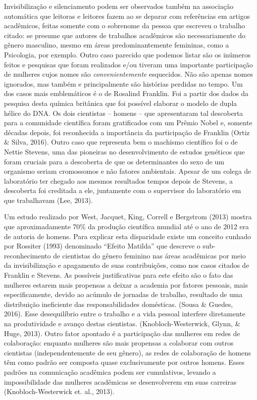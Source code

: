 Invisibilização e silenciamento podem ser observados também na associação automática que leitoras e leitores fazem ao se deparar com referências em artigos acadêmicos, feitas somente com o sobrenome da pessoa que escreveu o trabalho citado: se presume que autores de trabalhos acadêmicos são necessariamente do gênero masculino, mesmo em áreas predominantemente femininas, como a Psicologia, por exemplo. Outro caso parecido que podemos listar são os inúmeros feitos e pesquisas que foram realizados e/ou tiveram uma importante participação de mulheres cujos nomes são \textit{convenientemente} esquecidos. Não são apenas nomes ignorados, mas também e principalmente são histórias perdidas no tempo. Um dos casos mais emblemáticos é o de Rosalind Franklin. Foi a partir dos dados da pesquisa desta química britânica que foi possível elaborar o modelo de dupla hélice do DNA. Os dois cientistas – homens – que apresentaram tal descoberta para a comunidade científica foram gratificados com um Prêmio Nobel e, somente décadas depois, foi reconhecida a importância da participação de Franklin (Ortiz \& Silva, 2016). Outro caso que representa bem o machismo científico foi o de Nettie Stevens, uma das pioneiras no desenvolvimento de estudos genéticos que foram cruciais para a descoberta de que os determinantes do sexo de um organismo seriam cromossomos e não fatores ambientais. Apesar de um colega de laboratório ter chegado aos mesmos resultados tempos depois de Stevens, a descoberta foi creditada a ele, juntamente com o supervisor do laboratório em que trabalhavam (Lee, 2013).

Um estudo realizado por West, Jacquet, King, Correll e Bergstrom (2013) mostra que aproximadamente 70\% da produção científica mundial até o ano de 2012 era de autoria de homens. Para explicar esta disparidade existe um conceito cunhado por Rossiter (1993) denominado “Efeito Matilda” que descreve o sub-reconhecimento de cientistas do gênero feminino nas áreas acadêmicas por meio da invisibilização e apagamento de suas contribuições, como nos casos citados de Franklin e Stevens. As possíveis justificativas para este efeito são o fato das mulheres estarem mais propensas a deixar a academia por fatores pessoais, mais especificamente, devido ao acúmulo de jornadas de trabalho, resultado de uma distribuição ineficiente das responsabilidades domésticas. (Sousa \& Guedes, 2016). Esse desequilíbrio entre o trabalho e a vida pessoal interfere diretamente na produtividade e avanço destas cientistas. (Knobloch-Westerwick, Glynn, \& Huge, 2013). Outro fator apontado é a participação das mulheres em redes de colaboração: enquanto mulheres são mais propensas a colaborar com outros cientistas (independentemente de seu gênero), as redes de colaboração de homens têm como padrão ser composta quase exclusivamente por outros homens. Esses padrões na comunicação acadêmica podem ser cumulativos, levando a impossibilidade das mulheres acadêmicas se desenvolverem em suas carreiras (Knobloch-Westerwick et. al., 2013).

